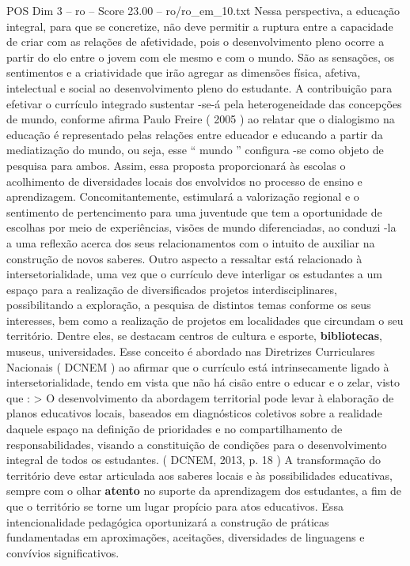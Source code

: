 \begin{textsample}{POS Dim 3 – ro – Score 23.00 – ro/ro\_em\_10.txt}
Nessa perspectiva, a educação integral, para que se concretize, não deve permitir a ruptura entre a capacidade de criar com as relações de afetividade, pois o desenvolvimento pleno ocorre a partir do elo entre o jovem com ele mesmo e com o mundo.
São as sensações, os sentimentos e a criatividade que irão agregar as dimensões física, afetiva, intelectual e social ao desenvolvimento pleno do estudante.
A contribuição para efetivar o currículo integrado sustentar -se-á pela heterogeneidade das concepções de mundo, conforme afirma Paulo Freire ( 2005 ) ao relatar que o dialogismo na educação é representado pelas relações entre educador e educando a partir da mediatização do mundo, ou seja, esse “ mundo ” configura -se como objeto de pesquisa para ambos.
Assim, essa proposta proporcionará às escolas o acolhimento de diversidades locais dos envolvidos no processo de ensino e aprendizagem.
Concomitantemente, estimulará a valorização regional e o sentimento de pertencimento para uma juventude que tem a oportunidade de escolhas por meio de experiências, visões de mundo diferenciadas, ao conduzi -la a uma reflexão acerca dos seus relacionamentos com o intuito de auxiliar na construção de novos saberes.
Outro aspecto a ressaltar está relacionado à intersetorialidade, uma vez que o currículo deve interligar os estudantes a um espaço para a realização de diversificados projetos interdisciplinares, possibilitando a exploração, a pesquisa de distintos temas conforme os seus interesses, bem como a realização de projetos em localidades que circundam o seu território.
Dentre eles, se destacam centros de cultura e esporte, \textbf{bibliotecas}, museus, universidades.
Esse conceito é abordado nas Diretrizes Curriculares Nacionais ( DCNEM ) ao afirmar que o currículo está intrinsecamente ligado à intersetorialidade, tendo em vista que não há cisão entre o educar e o zelar, visto que : > O desenvolvimento da abordagem territorial pode levar à elaboração de planos educativos locais, baseados em diagnósticos coletivos sobre a realidade daquele espaço na definição de prioridades e no compartilhamento de responsabilidades, visando a constituição de condições para o desenvolvimento integral de todos os estudantes. ( DCNEM, 2013, p. 18 ) A transformação do território deve estar articulada aos saberes locais e às possibilidades educativas, sempre com o olhar \textbf{atento} no suporte da aprendizagem dos estudantes, a fim de que o território se torne um lugar propício para atos educativos.
Essa intencionalidade pedagógica oportunizará a construção de práticas fundamentadas em aproximações, aceitações, diversidades de linguagens e convívios significativos.

\end{textsample}

